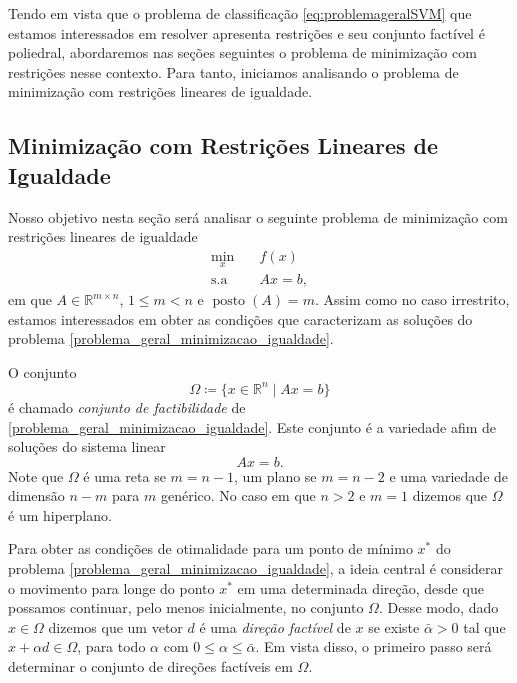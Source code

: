 \documentclass[12pt,a4paper]{scrartcl}
\DeclareMathOperator{\posto}{posto}
\def\RR{\mathds{R}}
\theoremstyle{definition}%
\begin{document}
Tendo em vista que o problema de classificação \eqref{eq:problemageralSVM} que estamos interessados em resolver apresenta restrições e seu conjunto factível é poliedral, abordaremos nas seções seguintes o problema de minimização com restrições nesse contexto. Para tanto, iniciamos analisando o problema de minimização com restrições lineares de igualdade.


\subsection{Minimização com Restrições Lineares de Igualdade} \label{section:restricoes_igualdade}

Nosso objetivo nesta seção será analisar o seguinte problema de minimização com restrições lineares de igualdade
\[ \label{problema_geral_minimizacao_igualdade}
\begin{aligned}
\min_{x} & \quad f(x) \\
\text{s.a} & \quad Ax=b,
\end{aligned}
\]
em que $A \in \RR^{m\times n}$, $1 \leq m <n$ e $\posto (A)=m$. Assim como no caso irrestrito, estamos interessados em obter as condições que caracterizam as soluções do problema \eqref{problema_geral_minimizacao_igualdade}.

O conjunto
\[
\Omega \coloneqq  \{ x \in \RR^{n} \mid Ax=b \}
\]
é chamado \emph{conjunto de factibilidade} de \eqref{problema_geral_minimizacao_igualdade}. Este conjunto é a variedade afim de soluções do sistema linear
\[ \label{eq:restricao_de_igualdade}
Ax=b.
\]
Note que $\Omega$ é uma reta se $m=n-1$, um plano se $m=n-2$ e uma variedade de dimensão $n-m$ para $m$ genérico. No caso em que $n>2$ e $m=1$ dizemos que $\Omega$ é um hiperplano. 

Para obter as condições de otimalidade para um ponto de mínimo $x^{*}$ do problema \eqref{problema_geral_minimizacao_igualdade}, a ideia central é considerar o movimento para longe do ponto $x^{*}$ em uma determinada direção, desde que possamos continuar, pelo menos inicialmente, no conjunto $\Omega$. Desse modo, dado $x \in \Omega$ dizemos que um vetor $d$ é uma \emph{direção factível} de $x$ se existe $\bar{\alpha} >0$ tal que $x + \alpha d \in \Omega$, para todo $\alpha$ com $0 \leq \alpha \leq \bar{\alpha}$. Em vista disso, o primeiro passo será determinar o conjunto de direções factíveis em $\Omega$. 
\end{document}
